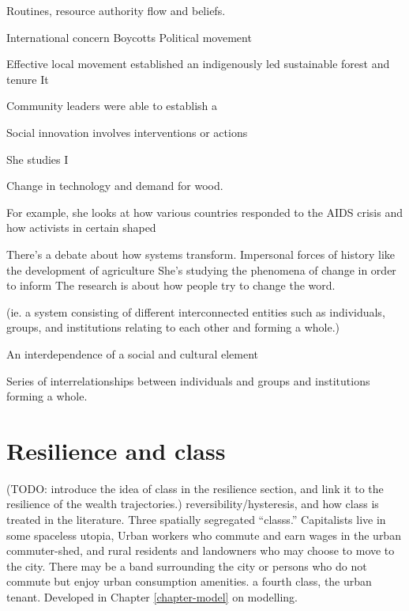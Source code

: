 Routines, resource authority flow and beliefs. 

International concern
Boycotts 
Political movement

Effective local movement established an indigenously led sustainable forest and tenure
It 



Community leaders were able to establish a 




Social innovation involves interventions or actions 




She studies I

Change in technology and demand for wood. 

For example, she looks at how various countries responded to the AIDS crisis and how activists in certain shaped 

There’s a debate about how systems transform. 
Impersonal forces of history like the development of agriculture
She’s studying the phenomena of change in order to inform 
The research is about how people try to change the word. 

(ie. a system consisting of different interconnected entities such as  individuals, groups, and institutions relating to each other and forming a whole.)

An interdependence of a social and cultural element 

Series of interrelationships between individuals and groups and institutions forming a whole. 





\section{Resilience and class}

(TODO: introduce the idea of class in the resilience section, and link it to the resilience of the wealth trajectories.)  
reversibility/hysteresis, and how class is treated in the literature.
Three spatially segregated ``\glspl{class}.'' Capitalists live in some spaceless utopia,  Urban workers who commute and earn wages in the urban commuter-shed, and  rural residents and landowners who may choose to move to the city. There may be a band surrounding the city or persons who do not commute but enjoy urban consumption amenities. 
a fourth class, the urban tenant. 
Developed in Chapter \ref{chapter-model} on modelling.

